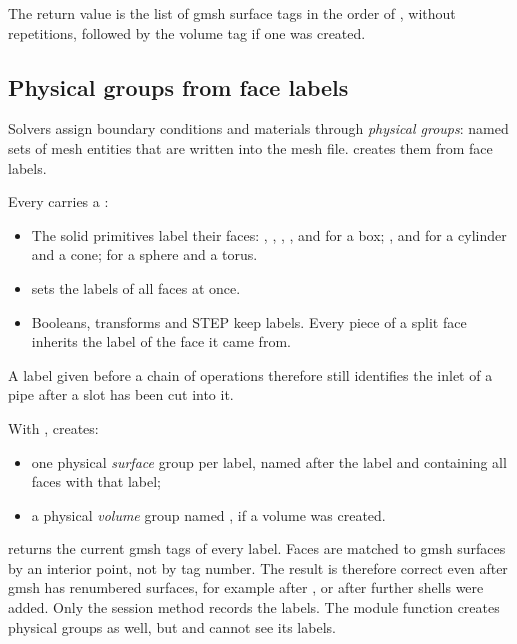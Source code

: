 The return value is the list of gmsh surface tags in the order of , without
repetitions, followed by the volume tag if one was created.

\subsection{Physical groups from face labels}

Solvers assign boundary conditions and materials through \emph{physical groups}: named sets of
mesh entities that are written into the mesh file. \NF{} creates them from face labels.

Every  carries a :
\begin{itemize}
  \item The solid primitives label their faces: , , ,
    ,  and  for a box; ,  and
     for a cylinder and a cone;  for a sphere and a torus.
  \item {} sets the labels of all faces at once.
  \item Booleans, transforms and STEP keep labels. Every piece of a split face inherits the
    label of the face it came from.
\end{itemize}
A label given before a chain of operations therefore still identifies the inlet of a pipe
after a slot has been cut into it.

With ,  creates:
\begin{itemize}
  \item one physical \emph{surface} group per label, named after the label and containing all
    faces with that label;
  \item a physical \emph{volume} group named , if a volume was created.
\end{itemize}

 returns the current gmsh tags of every label. Faces are matched to gmsh
surfaces by an interior point, not by tag number. The result is therefore correct even after
gmsh has renumbered surfaces, for example after , or after further
shells were added. Only the session method  records the labels. The module
function  creates physical groups as well, but  and
 cannot see its labels.

